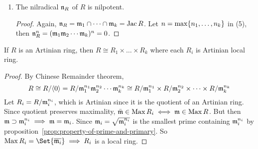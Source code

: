 \begin{prop}
\begin{enumerate}[(1)]
\begin{proof}
        Now, let $n_i$ be the one so that $\mf_i^{n_i} = \mf_i^{n_i+1}$.
        We claim that $\mf_1^{n_1}\mf_2^{n_2} \dotsm \mf_k^{n_k} = \gen{0}$.

        If not, let $\Sc = \Set{J \subseteq R \given J \mf_1^{n_1}
          \mf_2^{n_2} \dotsm \mf_k^{n_k} \neq 0} \neq \varnothing$
        since $\mf_i \in S$.
        By the fact that $R$ is Artinian, there exists
        a minimal element $J_0 \in \Sc$.
        By definition of $\Sc$, $\exists x \in J_0$ so that $x\mf_1^{n_1}\mf_2^{n_2} \dotsm \mf_k^{n_k}
        \neq 0$. Then $\gen{x} \in \Sc$ $\gen{x} \subseteq J_0$
        which by the minimality we must have $\gen{x} = J_0$.\\

        Also, $x \mf_1^{n_1+1}\mf_2^{n_2+1} \dotsm \mf_k^{n_k+1} =
        x \mf_1^{n_1}\mf_2^{n_2} \dotsm \mf_k^{n_k} \ne \gen{0}$,
        so $I = x \mf_1\dots \mf_k\in \Sc$ and $I \subseteq xR = J_0 \implies I = xR$.
        Then we have $\mf_1 \mf_2 \dotsm \mf_k = \mf_1 \cap \mf_2 \cap \dots \cap \mf_k = \Jac R$
        with $\Jac R (xR) = xR$ since $\Max R = \Spec R$. By Nakayama's lemma, $xR = 0 \implies x = 0$
        which leads to a contradiction.
      \end{proof}
    \item The nilradical $\mathfrak{n}_R$ of $R$ is nilpotent.
      \begin{proof}
        Again, $\mathfrak{n}_R = \mathfrak{m}_1 \cap \dotsb \cap \mathfrak{m}_k = \operatorname{Jac} R$. Let
        $n = \max \lbrace n_1, \dots, n_k\rbrace$ in (5), then
        $\mathfrak{n}_R^n = (\mathfrak{m}_1\mathfrak{m}_2 \dotsm\mathfrak{m}_k)^n = 0$.
      \end{proof}
  \end{enumerate}
\end{prop}

\begin{theorem}
  If $R$ is an Artinian ring,
  then $R \cong R_1 \times \dots \times R_k$ where each $R_i$ is Artinian local ring.
\begin{proof}
  By Chinese Remainder theorem,
  \[
    R \cong {R}/{\langle0\rangle} = {R}/{\mathfrak{m}_1^{n_1}\mathfrak{m}_2^{n_2} \dotsm \mathfrak{m}_k^{n_k}}
    \cong 
    {R}/{\mathfrak{m}_1^{n_1}} \times {R}/{\mathfrak{m}_2^{n_2}} \times \dots \times {R}/{\mathfrak{m}_k^{n_k}}
  \]
  Let $R_i = {R}/{\mathfrak{m}_i^{n_i}}$, which is Artinian since
  it is the quotient of an Artinian ring. Since
  quotient preserves maximality, $\bar{\mathfrak{m}} \in \operatorname{Max} R_i \iff
  \mathfrak{m} \in \operatorname{Max} R$. But then $\mathfrak{m} \supset \mathfrak{m}_i^{n_i} \implies \mathfrak{m} = \mathfrak{m}_i$.
  Since $\mathfrak{m}_i = \sqrt{\mathfrak{m}_i^{n_i}}$ is the smallest prime containing $\mathfrak{m}_i^{n_i}$
  by proposition~\ref{prop:property-of-prime-and-primary}.
  So $\Max R_i = \Set{\ob{\mf_i}} \implies R_i$ is a local ring.
\end{proof}
\end{theorem}

